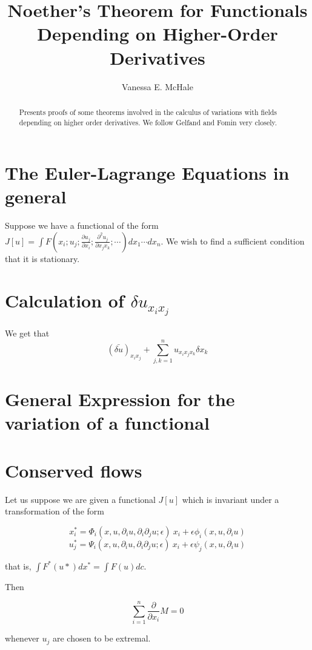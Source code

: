 \documentclass{article}
\begin{document}
\title{Noether's Theorem for Functionals Depending on Higher-Order Derivatives}
\author{Vanessa E. McHale}
\maketitle

\begin{abstract}
Presents proofs of some theorems involved in the calculus of variations with fields depending on higher order derivatives. We follow Gelfand and Fomin very closely.
\end{abstract}

\section{The Euler-Lagrange Equations in general}

Suppose we have a functional of the form $J[u]=\int F(x_i; u_j;\frac{\partial u_j}{\partial x_i};\frac{\partial^2u_j}{\partial x_j x_k};\cdots)dx_1\cdots dx_n$. We wish to find a sufficient condition that it is stationary.

\section{Calculation of $\delta u_{x_i x_j}$}

We get that $$(\bar{\delta u})_{x_ix_j}+\displaystyle\sum_{j,k=1}^nu_{x_i x_j x_k}\delta x_k$$

\section{General Expression for the variation of a functional}

\section{Conserved flows}
Let us suppose we are given a functional $J[u]$ which is invariant under a transformation of the form

$$x_i^*=\Phi_i(x,u,\partial_iu,\partial_i\partial_ju;\epsilon)~x_i+\epsilon\phi_i(x,u,\partial_i u)$$
$$u_j^*=\Psi_i(x,u,\partial_iu,\partial_i\partial_ju;\epsilon)~x_i+\epsilon\psi_j(x,u,\partial_i u)$$

that is, $\int F^*(u*)dx^*=\int F(u)dc$.

Then 

$$\sum_{i=1}^n\frac{\partial}{\partial x_i}M=0$$

whenever $u_j$ are chosen to be extremal.  
\end{document}
